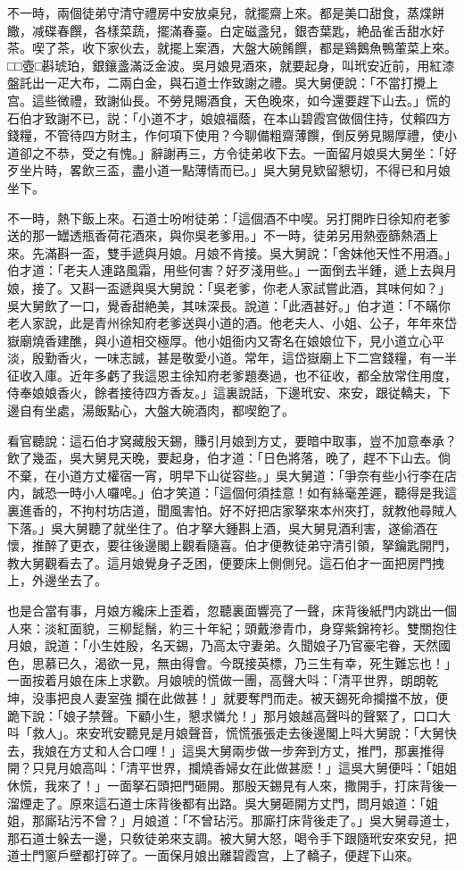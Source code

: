 不一時，兩個徒弟守清守禮房中安放桌兒，就擺齋上來。都是美口甜食，蒸煠餅饊，减碟春饌，各樣菜蔬，擺滿春臺。白定磁盞兒，銀杏葉匙，絶品雀舌甜水好茶。喫了茶，收下家伙去，就擺上案酒，大盤大碗餚饌，都是鷄鵝魚鴨葷菜上來。□□壺□斟琥珀，銀鑲盞滿泛金波。吳月娘見酒來，就要起身，叫玳安近前，用紅漆盤託出一疋大布，二兩白金，與石道士作致謝之禮。吳大舅便說：「不當打攪上宫。這些微禮，致謝仙長。不勞見賜酒食，天色晚來，如今還要趕下山去。」慌的石伯才致謝不已，説：「小道不才，娘娘福蔭，在本山碧霞宫做個住持，仗賴四方錢糧，不管待四方財主，作何項下使用？今聊備粗齋薄饌，倒反勞見賜厚禮，使小道卻之不恭，受之有愧。」辭謝再三，方令徒弟收下去。一面留月娘吳大舅坐：「好歹坐片時，畧飲三盃，盡小道一點薄情而已。」吳大舅見欵留懇切，不得已和月娘坐下。

不一時，熱下飯上來。石道士吩咐徒弟：「這個酒不中喫。另打開昨日徐知府老爹送的那一罎透瓶香荷花酒來，與你吳老爹用。」不一時，徒弟另用熱壺篩熱酒上來。先滿斟一盃，雙手遞與月娘。月娘不肯接。吳大舅說：「舍妹他天性不用酒。」伯才道：「老夫人連路風霜，用些何害？好歹淺用些。」一面倒去半鍾，遞上去與月娘，接了。又斟一盃遞與吳大舅說：「吳老爹，你老人家試嘗此酒，其味何如？」吳大舅飲了一口，覺香甜絶美，其味深長。說道：「此酒甚好。」伯才道：「不瞞你老人家說，此是青州徐知府老爹送與小道的酒。他老夫人、小姐、公子，年年來岱嶽廟燒香建醮，與小道相交極厚。他小姐衙内又寄名在娘娘位下，見小道立心平淡，殷勤香火，一味志誠，甚是敬愛小道。常年，這岱嶽廟上下二宫錢糧，有一半征收入庫。近年多虧了我這恩主徐知府老爹題奏過，也不征收，都全放常住用度，侍奉娘娘香火，餘者接待四方香友。」這裏說話，下邊玳安、來安，跟従轎夫，下邊自有坐處，湯飯點心，大盤大碗酒肉，都喫飽了。

看官聽說：這石伯才窝藏殷天錫，賺引月娘到方丈，要暗中取事，豈不加意奉承？飲了幾盃，吳大舅見天晚，要起身，伯才道：「日色將落，晚了，趕不下山去。倘不棄，在小道方丈權宿一宵，明早下山従容些。」吳大舅道：「爭奈有些小行李在店内，誠恐一時小人囉唣。」伯才笑道：「這個何須挂意！如有絲毫差遲，聽得是我這裏進香的，不拘村坊店道，聞風害怕。好不好把店家拏來本州夾打，就教他尋賊人下落。」吳大舅聽了就坐住了。伯才拏大鍾斟上酒，吳大舅見酒利害，遂偷酒在懷，推醉了更衣，要往後邊閣上觀看隨喜。伯才便教徒弟守清引領，拏鑰匙開門，教大舅觀看去了。這月娘覺身子乏困，便要床上側側兒。這石伯才一面把房門拽上，外邊坐去了。

也是合當有事，月娘方纔床上歪着，忽聽裏面響亮了一聲，床背後紙門内跳出一個人來：淡紅面貌，三柳髭鬚，約三十年紀；頭戴滲青巾，身穿紫錦袴衫。雙關抱住月娘，說道：「小生姓殷，名天錫，乃高太守妻弟。久聞娘子乃官豪宅眷，天然國色，思慕已久，渴欲一見，無由得會。今既接英標，乃三生有幸，死生難忘也！」一面按着月娘在床上求歡。月娘唬的慌做一團，高聲大呌：「清平世界，朗朗乾坤，没事把良人妻室強𢺞攔在此做甚！」就要奪門而走。被天錫死命攔擋不放，便跪下說：「娘子禁聲。下顧小生，懇求憐允！」那月娘越高聲呌的聲緊了，口口大呌「救人」。來安玳安聽見是月娘聲音，慌慌張張走去後邊閣上呌大舅說：「大舅快去，我娘在方丈和人合口哩！」這吳大舅兩步做一步奔到方丈，推門，那裏推得開？只見月娘高叫：「清平世界，攔燒香婦女在此做甚麽！」這吳大舅便呌：「姐姐休慌，我來了！」一面拏石頭把門砸開。那殷天錫見有人來，撒開手，打床背後一溜煙走了。原來這石道士床背後都有出路。吳大舅砸開方丈門，問月娘道：「姐姐，那廝玷污不曾？」月娘道：「不曾玷污。那廝打床背後走了。」吳大舅尋道士，那石道士躲去一邊，只敎徒弟來支調。被大舅大怒，喝令手下跟隨玳安來安兒，把道士門窻戶壁都打碎了。一面保月娘出離碧霞宫，上了轎子，便趕下山來。

